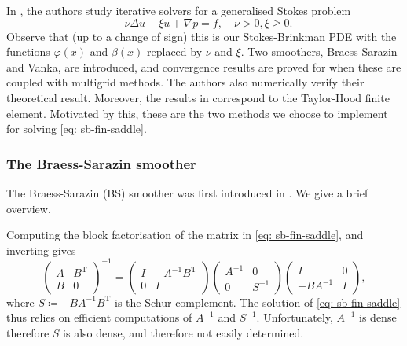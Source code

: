\documentclass[12pt]{article}
\theoremstyle{theorem}
\begin{document}
In \cite{larin2008}, the authors study iterative solvers for a generalised Stokes problem 
\begin{equation}\label{eq: gen-stokes}
-\nu \Delta u + \xi u + \nabla p = f, \quad \nu > 0, \xi \geq 0.
\end{equation}
Observe that (up to a change of sign) this is our Stokes-Brinkman PDE with the functions $\varphi(x)$ and $\beta(x)$ replaced by $\nu$ and $\xi$. Two smoothers, Braess-Sarazin and Vanka, are introduced, and convergence results are proved for when these are coupled with multigrid methods. The authors also numerically verify their theoretical result. Moreover, the results in \cite{larin2008} correspond to the Taylor-Hood finite element. Motivated by this, these are the two methods we choose to implement for solving \eqref{eq: sb-fin-saddle}.

\subsubsection{The Braess-Sarazin smoother}

The Braess-Sarazin (BS) smoother was first introduced in \cite{braess1997}. We give a brief overview.

Computing the block factorisation of the matrix in \eqref{eq: sb-fin-saddle}, and inverting gives
\begin{equation}
    \begin{pmatrix}
        A & B^{\mathrm{T}} \\
        B & 0 
    \end{pmatrix}^{-1}
    =
    \begin{pmatrix}
        I & -A^{-1}B^{\mathrm{T}} \\
        0 & I
    \end{pmatrix}
    \begin{pmatrix}
        A^{-1} & 0 \\
        0 & S^{-1}
    \end{pmatrix}
    \begin{pmatrix}
        I & 0 \\
        -BA^{-1} & I
    \end{pmatrix},
\end{equation}
where $S \coloneqq -B A^{-1} B^{\mathrm{T}}$ is the Schur complement. The solution of \eqref{eq: sb-fin-saddle} thus relies on efficient computations of $A^{-1}$ and $S^{-1}$. Unfortunately, $A^{-1}$ is dense therefore $S$ is also dense, and therefore not easily determined.
\end{document}
